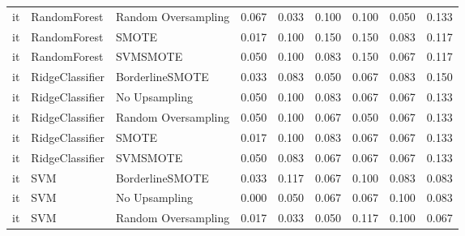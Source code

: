 \begin{tabular}{lllllllll}
      it &                 RandomForest & Random Oversampling & 0.067 &                     0.033 &                 0.100 &                  0.100 &                                   0.050 &     0.133 \\
      it &                 RandomForest &               SMOTE & 0.017 &                     0.100 &                 0.150 &                  0.150 &                                   0.083 &     0.117 \\
      it &                 RandomForest &            SVMSMOTE & 0.050 &                     0.100 &                 0.083 &                  0.150 &                                   0.067 &     0.117 \\
      it &              RidgeClassifier &     BorderlineSMOTE & 0.033 &                     0.083 &                 0.050 &                  0.067 &                                   0.083 &     0.150 \\
      it &              RidgeClassifier &       No Upsampling & 0.050 &                     0.100 &                 0.083 &                  0.067 &                                   0.067 &     0.133 \\
      it &              RidgeClassifier & Random Oversampling & 0.050 &                     0.100 &                 0.067 &                  0.050 &                                   0.067 &     0.133 \\
      it &              RidgeClassifier &               SMOTE & 0.017 &                     0.100 &                 0.083 &                  0.067 &                                   0.067 &     0.133 \\
      it &              RidgeClassifier &            SVMSMOTE & 0.050 &                     0.083 &                 0.067 &                  0.067 &                                   0.067 &     0.133 \\
      it &                          SVM &     BorderlineSMOTE & 0.033 &                     0.117 &                 0.067 &                  0.100 &                                   0.083 &     0.083 \\
      it &                          SVM &       No Upsampling & 0.000 &                     0.050 &                 0.067 &                  0.067 &                                   0.100 &     0.083 \\
      it &                          SVM & Random Oversampling & 0.017 &                     0.033 &                 0.050 &                  0.117 &                                   0.100 &     0.067 \\

\end{tabular}
